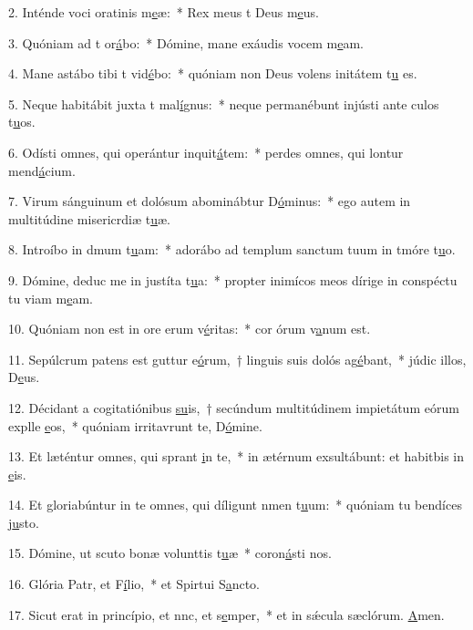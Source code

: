 2. Inténde voci oratinis m\uline{e}æ:~* Rex meus t Deus m\uline{e}us.\par 
3. Quóniam ad t or\uline{á}bo:~* Dómine, mane exáudis vocem m\uline{e}am.\par 
4. Mane astábo tibi t vid\uline{é}bo:~* quóniam non Deus volens initátem t\uline{u} es.\par 
5. Neque habitábit juxta t mal\uline{í}gnus:~* neque permanébunt injústi ante culos t\uline{u}os.\par 
6. Odísti omnes, qui operántur inquit\uline{á}tem:~* perdes omnes, qui lontur mend\uline{á}cium.\par 
7. Virum sánguinum et dolósum abominábtur D\uline{ó}minus:~* ego autem in multitúdine misericrdiæ t\uline{u}æ.\par 
8. Introíbo in dmum t\uline{u}am:~* adorábo ad templum sanctum tuum in tmóre t\uline{u}o.\par 
9. Dómine, deduc me in justíta t\uline{u}a:~* propter inimícos meos dírige in conspéctu tu viam m\uline{e}am.\par 
10. Quóniam non est in ore erum v\uline{é}ritas:~* cor órum v\uline{a}num est.\par 
11. Sepúlcrum patens est guttur e\uline{ó}rum,~† linguis suis dolós ag\uline{é}bant,~* júdic illos, D\uline{e}us.\par 
12. Décidant a cogitatiónibus \uline{su}is,~† secúndum multitúdinem impietátum eórum explle \uline{e}os,~* quóniam irritavrunt te, D\uline{ó}mine.\par 
13. Et læténtur omnes, qui sprant \uline{i}n te,~* in ætérnum exsultábunt: et habitbis in \uline{e}is.\par 
14. Et gloriabúntur in te omnes, qui díligunt nmen t\uline{u}um:~* quóniam tu bendíces j\uline{u}sto.\par 
15. Dómine, ut scuto bonæ volunttis t\uline{u}æ~* coron\uline{á}sti nos.\par 
16. Glória Patr, et F\uline{í}lio,~* et Spirtui S\uline{a}ncto.\par 
17. Sicut erat in princípio, et nnc, et s\uline{e}mper,~* et in sǽcula sæclórum. \uline{A}men.\par 
